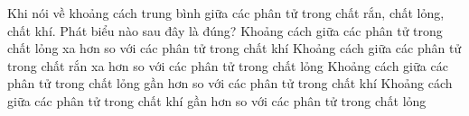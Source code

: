 \begin{ex} 
	Khi nói về khoảng cách trung bình giữa các phân tử trong chất rắn, chất lỏng, chất khí. Phát biểu nào sau đây là đúng?
	\choice
	{Khoảng cách giữa các phân tử trong chất lỏng xa hơn so với các phân tử trong chất khí}
	{Khoảng cách giữa các phân tử trong chất rắn xa hơn so với các phân tử trong chất lỏng}
	{\True Khoảng cách giữa các phân tử trong chất lỏng gần hơn so với các phân tử trong chất khí}
	{Khoảng cách giữa các phân tử trong chất khí gần hơn so với các phân tử trong chất lỏng}
\end{ex}

